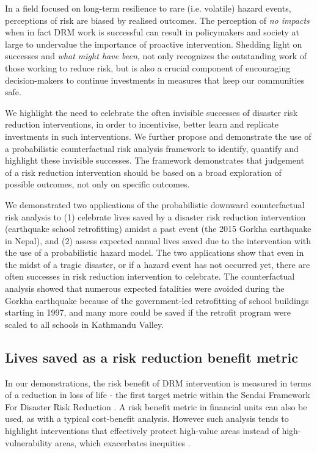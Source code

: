 In a field focused on long-term resilience to rare (i.e. volatile) hazard events, perceptions of risk are biased by realised outcomes. The perception of \textit{no impacts} when in fact DRM work is successful can result in policymakers and society at large to undervalue the importance of proactive intervention. Shedding light on successes and \textit{what might have been}, not only recognizes the outstanding work of those working to reduce risk, but is also a crucial component of encouraging decision-makers to continue investments in measures that keep our communities safe. 

We highlight the need to celebrate the often invisible successes of disaster risk reduction interventions, in order to incentivise, better learn and replicate investments in such interventions. We further propose and demonstrate the use of a probabilistic counterfactual risk analysis framework to identify, quantify and highlight these invisible successes. The framework demonstrates that judgement of a risk reduction intervention should be based on a broad exploration of possible outcomes, not only on specific outcomes.

We demonstrated two applications of the probabilistic downward counterfactual risk analysis to (1) celebrate lives saved by a disaster risk reduction intervention (earthquake school retrofitting) amidst a past event (the 2015 Gorkha earthquake in Nepal), and (2) assess expected annual lives saved due to the intervention with the use of a probabilistic hazard model. The two applications show that even in the midst of a tragic disaster, or if a hazard event has not occurred yet, there are often successes in risk reduction intervention to celebrate. The counterfactual analysis showed that numerous expected fatalities were avoided during the Gorkha earthquake because of the government-led retrofitting of school buildings starting in 1997, and many more could be saved if the retrofit program were scaled to all schools in Kathmandu Valley. 

\vspace{0.5cm} %

\subsection{Lives saved as a risk reduction benefit metric}

In our demonstrations, the risk benefit of DRM intervention is measured in terms of a reduction in loss of life - the first target metric within the Sendai Framework For Disaster Risk Reduction \citep{united2015sendai}. A risk benefit metric in financial units can also be used, as with a typical cost-benefit analysis. However such analysis tends to highlight interventions that effectively protect high-value areas instead of high-vulnerability areas, which exacerbates inequities \citep{markhvida_quantification_2020, lallemant2020informatics}. 

